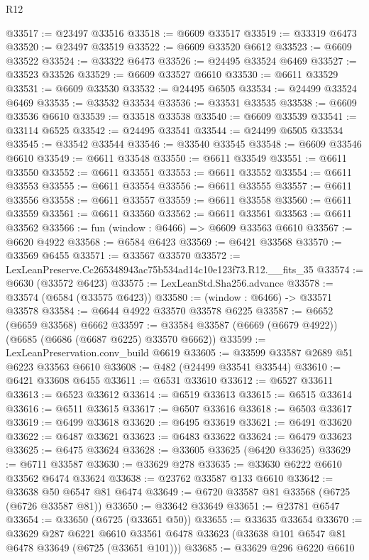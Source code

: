 \begin{lexlean}{R12}
\begin{coremodule}
@33517 := @23497 @33516
@33518 := @6609 @33517
@33519 := @33319 @6473
@33520 := @23497 @33519
@33522 := @6609 @33520 @6612
@33523 := @6609 @33522
@33524 := @33322 @6473
@33526 := @24495 @33524 @6469
@33527 := @33523 @33526
@33529 := @6609 @33527 @6610
@33530 := @6611 @33529
@33531 := @6609 @33530
@33532 := @24495 @6505
@33534 := @24499 @33524 @6469
@33535 := @33532 @33534
@33536 := @33531 @33535
@33538 := @6609 @33536 @6610
@33539 := @33518 @33538
@33540 := @6609 @33539
@33541 := @33114 @6525
@33542 := @24495 @33541
@33544 := @24499 @6505 @33534
@33545 := @33542 @33544
@33546 := @33540 @33545
@33548 := @6609 @33546 @6610
@33549 := @6611 @33548
@33550 := @6611 @33549
@33551 := @6611 @33550
@33552 := @6611 @33551
@33553 := @6611 @33552
@33554 := @6611 @33553
@33555 := @6611 @33554
@33556 := @6611 @33555
@33557 := @6611 @33556
@33558 := @6611 @33557
@33559 := @6611 @33558
@33560 := @6611 @33559
@33561 := @6611 @33560
@33562 := @6611 @33561
@33563 := @6611 @33562
@33566 := fun (window : @6466) => @6609 @33563 @6610
@33567 := @6620 @4922
@33568 := @6584 @6423
@33569 := @6421 @33568
@33570 := @33569 @6455
@33571 := @33567 @33570
@33572 := LexLeanPreserve.Cc265348943ac75b534ad14c10e123f73.R12.__fits_35
@33574 := @6630 (@33572 @6423)
@33575 := LexLeanStd.Sha256.advance
@33578 := @33574 (@6584 (@33575 @6423))
@33580 := (window : @6466) -> @33571 @33578
@33584 := @6644 @4922 @33570 @33578 @6225
@33587 := @6652 (@6659 @33568) @6662
@33597 := @33584 @33587 (@6669 (@6679 @4922)) (@6685 (@6686 (@6687 @6225) @33570 @6662))
@33599 := LexLeanPreservation.conv_build @6619
@33605 := @33599 @33587 @2689 @51 @6223 @33563 @6610
@33608 := @482 (@24499 @33541 @33544)
@33610 := @6421 @33608 @6455
@33611 := @6531 @33610
@33612 := @6527 @33611
@33613 := @6523 @33612
@33614 := @6519 @33613
@33615 := @6515 @33614
@33616 := @6511 @33615
@33617 := @6507 @33616
@33618 := @6503 @33617
@33619 := @6499 @33618
@33620 := @6495 @33619
@33621 := @6491 @33620
@33622 := @6487 @33621
@33623 := @6483 @33622
@33624 := @6479 @33623
@33625 := @6475 @33624
@33628 := @33605 @33625 (@6420 @33625)
@33629 := @6711 @33587
@33630 := @33629 @278
@33635 := @33630 @6222 @6610 @33562 @6474 @33624
@33638 := @23762 @33587 @133 @6610
@33642 := @33638 @50 @6547 @81 @6474
@33649 := @6720 @33587 @81 @33568 (@6725 (@6726 @33587 @81))
@33650 := @33642 @33649
@33651 := @23781 @6547
@33654 := @33650 (@6725 (@33651 @50))
@33655 := @33635 @33654
@33670 := @33629
    @287
    @6221
    @6610
    @33561
    @6478
    @33623
    (@33638 @101 @6547 @81 @6478 @33649 (@6725 (@33651 @101)))
@33685 := @33629
    @296
    @6220
    @6610

\end{coremodule}
\end{lexlean}
